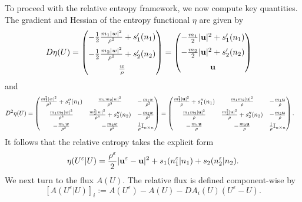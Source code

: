 \documentclass[10pt,reqno]{amsart}
\numberwithin{equation}{section}
\newcommand{\ve}{\varepsilon}
\begin{document}
To proceed with the relative entropy framework, we now compute key quantities. The gradient and Hessian of the entropy functional $\eta$ are given by
\begin{align*}
    D\eta(U) &= \begin{pmatrix} -\frac{1}{2}\frac{m_1|w|^2}{\rho^2} + s_1'(n_1) \\[6pt]
    -\frac{1}{2}\frac{m_2|w|^2}{\rho^2} + s_2'(n_2) \\[6pt]
    \frac{w}{\rho}
    \end{pmatrix}= \begin{pmatrix} -\frac{m_1}{2}|{\bf{u}}|^2 + s_1'(n_1) \\[6pt]
     -\frac{m_2}{2}|{\bf{u}}|^2 + s_2'(n_2) \\[6pt]
   {\bf{u}}
    \end{pmatrix}
    \end{align*}
    and
    \begin{align*}
    D^2\eta(U) &=  \begin{pmatrix}
        \frac{m_1^2|w|^2}{\rho^3} + s_1''(n_1) & \frac{m_1m_2|w|^2}{\rho^3}  & -\frac{m_1 w}{\rho^2}  \\[6pt]
        \frac{m_1 m_2|w|^2}{\rho^3}& \frac{m_2^2|w|^2}{\rho^3} + s_2''(n_2) & - \frac{m_2 w}{\rho^2} \\[6pt]
        - \frac{m_1 w}{\rho^2} & - \frac{m_2 w}{\rho^2} & \frac{1}{\rho} \mathbb{I}_{n\times n}
    \end{pmatrix}  =  \begin{pmatrix}
        \frac{m_1^2|{\bf{u}}|^2}{\rho} + s_1''(n_1) & \frac{m_1m_2|{\bf{u}}|^2}{\rho}  & -\frac{m_1 {\bf{u}}}{\rho}  \\[6pt]
        \frac{m_1 m_2|{\bf{u}}|^2}{\rho}& \frac{m_2^2|{\bf{u}}|^2}{\rho} + s_2''(n_2) & - \frac{m_2 {\bf{u}}}{\rho} \\[6pt]
        - \frac{m_1 {\bf{u}}}{\rho} & - \frac{m_2 {\bf{u}}}{\rho} & \frac{1}{\rho} \mathbb{I}_{n\times n}
    \end{pmatrix}.
\end{align*}
It follows that the relative entropy takes the explicit form
\[
    \eta(U^\ve|U) = \frac{\rho^\ve}{2}|{\bf{u}}^\ve - {\bf{u}}|^2 + s_1(n_1^\ve|n_1) + s_2(n_2^\ve|n_2).
\]
We next turn to the flux $A(U)$. The relative flux is defined component-wise by
\[
    [A(U^\ve|U)]_i := A(U^\ve) - A(U) - DA_i(U)(U^\ve - U).
\]
\end{document}
